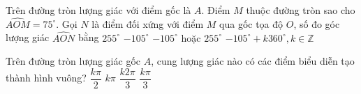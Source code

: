 \begin{ex}%
	 Trên đường tròn lượng giác với điểm gốc là $A$. Điểm $M$ thuộc đường tròn sao cho $\widehat{AOM}=75^{\circ}$. Gọi $N$ là điểm đối xứng với điểm $M$ qua gốc tọa độ $O$, số đo góc lượng giác $\widehat{AON}$ bằng
	\choice
	{$255^{\circ}$}
	{$-105^{\circ}$}
	{\True $-105^{\circ}$ hoặc $255^{\circ}$}
	{$-105^{\circ}+k 360^{\circ}, k \in \mathbb{Z}$}
\end{ex}
\begin{ex}%
	Trên đường tròn lượng giác gốc $A$, cung lượng giác nào có các điểm biểu diễn tạo thành hình vuông?
	\choice
	{\True $\dfrac{k \pi}{2}$}
	{$k \pi$}
	{$\dfrac{k 2 \pi}{3}$}
	{$\dfrac{k \pi}{3}$}
\end{ex}

